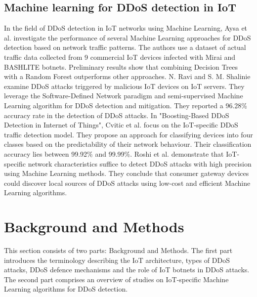 \documentclass[conference, 11pt]{IEEEtran}
\begin{document}
\subsection{Machine learning for DDoS detection in IoT}
In the field of DDoS detection in IoT networks using Machine Learning, Aysa et al. investigate the performance of several Machine Learning approaches for DDoS detection based on network traffic patterns.
The authors use a dataset of actual traffic data collected from 9 commercial IoT devices infected with Mirai and BASHLITE botnets.
Preliminary results show that combining Decision Trees with a Random Forest outperforms other approaches.
N. Ravi and S. M. Shalinie examine DDoS attacks triggered by malicious IoT devices on IoT servers.
They leverage the Software-Defined Network paradigm and semi-supervised Machine Learning algorithm for DDoS detection and mitigation.
They reported a 96.28\% accuracy rate in the detection of DDoS attacks.
In "Boosting-Based DDoS Detection in Internet of Things", Cvitic et al. focus on the IoT-specific DDoS traffic detection model.
They propose an approach for classifying devices into four classes based on the predictability of their network behaviour.
Their classification accuracy lies between 99.92\% and 99.99\%.
Roshi et al. demonstrate that IoT-specific network characteristics suffice to detect DDoS attacks with high precision using Machine Learning methods.
They conclude that consumer gateway devices could discover local sources of DDoS attacks using low-cost and efficient Machine Learning algorithms.

\section{Background and Methods}
This section consists of two parts: Background and Methods.
The first part introduces the terminology describing the IoT architecture, types of DDoS attacks, DDoS defence mechanisms and the role of IoT botnets in DDoS attacks.
The second part comprises an overview of studies on IoT-specific Machine Learning algorithms for DDoS detection.
\end{document}
